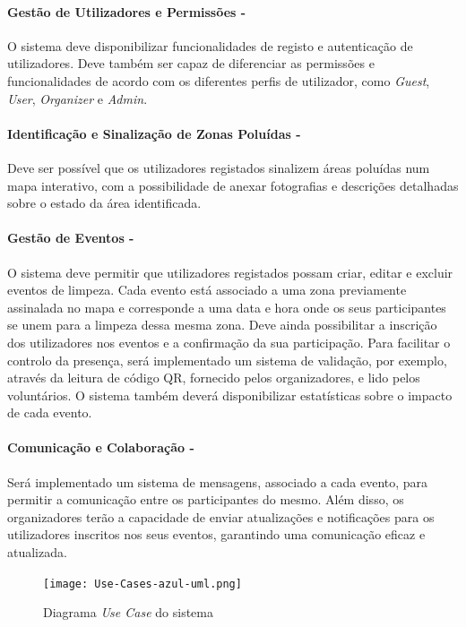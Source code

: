 \documentclass[a4paper,11pt]{article}
\begin{document}
\paragraph{Gestão de Utilizadores e Permissões -}
O sistema deve disponibilizar funcionalidades de registo e autenticação de utilizadores. Deve também ser capaz de diferenciar as permissões e funcionalidades de acordo com os diferentes perfis de utilizador, como \textit{Guest}, \textit{User}, \textit{Organizer} e \textit{Admin}.

\paragraph{Identificação e Sinalização de Zonas Poluídas -}
Deve ser possível que os utilizadores registados sinalizem áreas poluídas num mapa interativo, com a possibilidade de anexar fotografias e descrições detalhadas sobre o estado da área identificada.

\paragraph{Gestão de Eventos -}
O sistema deve permitir que utilizadores registados possam criar, editar e excluir eventos de limpeza. Cada evento está associado a uma zona previamente assinalada no mapa e corresponde a uma data e hora onde os seus participantes se unem para a limpeza dessa mesma zona. Deve ainda possibilitar a inscrição dos utilizadores nos eventos e a confirmação da sua participação. Para facilitar o controlo da presença, será implementado um sistema de validação, por exemplo, através da leitura de código QR, fornecido pelos organizadores, e lido pelos voluntários. O sistema também deverá disponibilizar estatísticas sobre o impacto de cada evento.

\paragraph{Comunicação e Colaboração -}
Será implementado um sistema de mensagens, associado a cada evento, para permitir a comunicação entre os participantes do mesmo. Além disso, os organizadores terão a capacidade de enviar atualizações e notificações para os utilizadores inscritos nos seus eventos, garantindo uma comunicação eficaz e atualizada.

\begin{figure}[H]
    \centering
    \texttt{[image: Use-Cases-azul-uml.png]}
    \caption{Diagrama \textit{Use Case} do sistema}
    \label{fig:usecase}
\end{figure}
\end{document}
